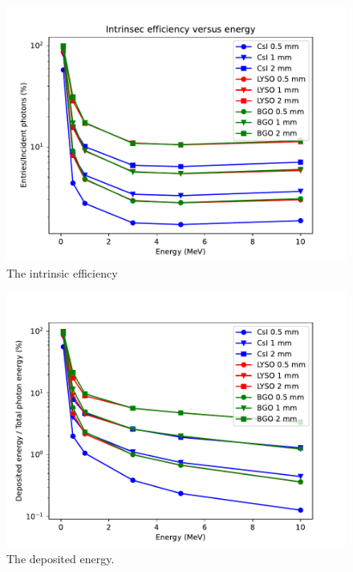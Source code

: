 \documentclass{article}
\begin{document}
\begin{figure}[H]
    \centering
    \includegraphics[width=0.8\linewidth]{images/task5/intrinsic_eff.pdf}
    \caption{The intrinsic efficiency}
\end{figure}
\begin{figure}[H]
    \centering
    \includegraphics[width=0.8\linewidth]{images/task5/edep_versus_total.pdf}
    \caption{The deposited energy.}
\end{figure}
\end{document}
